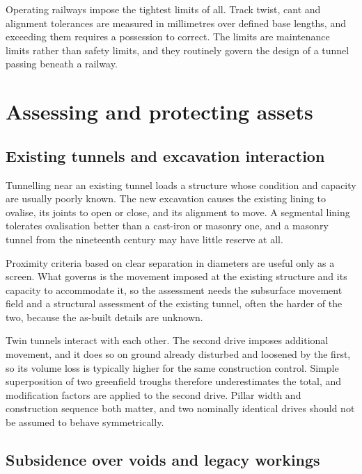 Operating railways impose the tightest limits of all. Track twist, cant and
alignment tolerances are measured in millimetres over defined base lengths,
and exceeding them requires a possession to correct. The limits are
maintenance limits rather than safety limits, and they routinely govern the
design of a tunnel passing beneath a railway.

\section{Assessing and protecting assets}
\label{sec:assessing-protecting}

\subsection{Existing tunnels and excavation interaction}
\label{sec:existing-tunnels-interaction}

Tunnelling near an existing tunnel loads a structure whose condition and
capacity are usually poorly known. The new excavation causes the existing
lining to ovalise, its joints to open or close, and its alignment to move. A
segmental lining tolerates ovalisation better than a cast-iron or masonry one,
and a masonry tunnel from the nineteenth century may have little reserve at
all.

Proximity criteria based on clear separation in diameters are useful only as
a screen. What governs is the movement imposed at the existing structure
and its capacity to accommodate it, so the assessment needs the subsurface
movement field and a structural assessment of the existing tunnel, often
the harder of the two, because the as-built details are unknown.

Twin tunnels interact with each other. The second drive imposes additional
movement, and it does so on ground already disturbed and loosened by the
first, so its volume loss is typically higher for the same construction
control. Simple superposition of two greenfield troughs therefore
underestimates the total, and modification factors are applied to the second
drive. Pillar width and construction sequence both matter, and two nominally
identical drives should not be assumed to behave symmetrically.

\subsection{Subsidence over voids and legacy workings}
\label{sec:void-subsidence}

